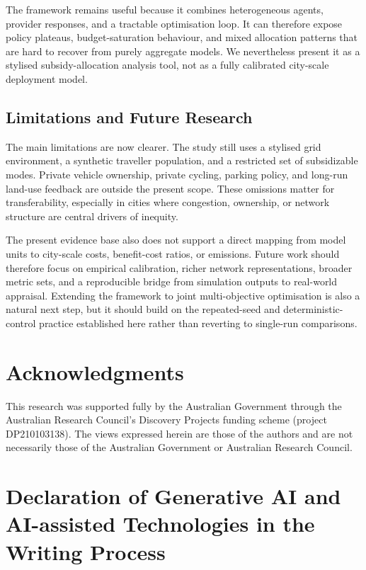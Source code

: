 \documentclass[a4paper,fleqn]{cas-sc}
\begin{document}
The framework remains useful because it combines heterogeneous agents, provider responses, and a tractable optimisation loop. It can therefore expose policy plateaus, budget-saturation behaviour, and mixed allocation patterns that are hard to recover from purely aggregate models. We nevertheless present it as a stylised subsidy-allocation analysis tool, not as a fully calibrated city-scale deployment model.

\subsection{Limitations and Future Research}
The main limitations are now clearer. The study still uses a stylised grid environment, a synthetic traveller population, and a restricted set of subsidizable modes. Private vehicle ownership, private cycling, parking policy, and long-run land-use feedback are outside the present scope. These omissions matter for transferability, especially in cities where congestion, ownership, or network structure are central drivers of inequity.

The present evidence base also does not support a direct mapping from model units to city-scale costs, benefit-cost ratios, or emissions. Future work should therefore focus on empirical calibration, richer network representations, broader metric sets, and a reproducible bridge from simulation outputs to real-world appraisal. Extending the framework to joint multi-objective optimisation is also a natural next step, but it should build on the repeated-seed and deterministic-control practice established here rather than reverting to single-run comparisons.

\section{Acknowledgments}

This research was supported fully by the Australian Government through the Australian Research Council's Discovery Projects funding scheme (project DP210103138). The views expressed herein are those of the authors and are not necessarily those of the Australian Government or Australian Research Council.

\section{Declaration of Generative AI and AI-assisted Technologies in the Writing Process}
\end{document}
